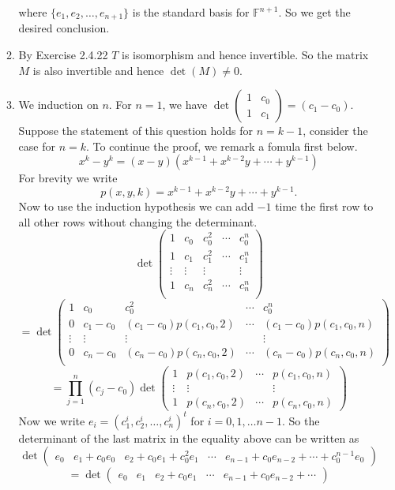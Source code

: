 \begin{enumerate}
\begin{enumerate}
where $\{e_1,e_2,\ldots ,e_{n+1}\}$ is the standard basis for $\mathbb{F}^{n+1}$. So we get the desired conclusion.
\item By Exercise 2.4.22 $T$ is isomorphism and hence invertible. So the matrix $M$ is also invertible and hence $\det(M)\neq 0$.
\item We induction on $n$. For $n=1$, we have $\det\begin{pmatrix}1&c_0\\1&c_1\end{pmatrix}=(c_1-c_0)$. Suppose the statement of this question holds for $n=k-1$, consider the case for $n=k$. To continue the proof, we remark a fomula first below.
\[x^k-y^k=(x-y)(x^{k-1}+x^{k-2}y+\cdots +y^{k-1})\]
For brevity we write 
\[p(x,y,k)=x^{k-1}+x^{k-2}y+\cdots +y^{k-1}.\]
Now to use the induction hypothesis we can add $-1$ time the first row to all other rows without changing the determinant.
\[\det\begin{pmatrix}1&c_0&c_0^2&\cdots &c_0^n\\1&c_1&c_1^2&\cdots &c_1^n\\\vdots &\vdots &\vdots & &\vdots \\1&c_n&c_n^2&\cdots &c_n^n\\\end{pmatrix}\]
\[=\det\begin{pmatrix}1&c_0&c_0^2&\cdots &c_0^n\\0&c_1-c_0&(c_1-c_0)p(c_1,c_0,2)&\cdots &(c_1-c_0)p(c_1,c_0,n)\\\vdots &\vdots &\vdots & &\vdots \\0&c_n-c_0&(c_n-c_0)p(c_n,c_0,2)&\cdots &(c_n-c_0)p(c_n,c_0,n)\\\end{pmatrix}\]
\[=\prod_{j=1}^n{(c_j-c_0)}\det\begin{pmatrix}1&p(c_1,c_0,2)&\cdots &p(c_1,c_0,n)\\\vdots &\vdots & &\vdots \\1&p(c_n,c_0,2)&\cdots &p(c_n,c_0,n)\end{pmatrix}\]
Now we write $e_i=(c_1^i,c_2^i,\ldots ,c_n^i)^t$ for $i=0,1,\ldots n-1$. So the determinant of the last matrix in the equality above can be written as 
\[\det\begin{pmatrix}e_0&e_1+c_0e_0&e_2+c_0e_1+c_0^2e_1&\cdots &e_{n-1}+c_0e_{n-2}+\cdots +c_0^{n-1}e_0\end{pmatrix}\] 
\[=\det\begin{pmatrix}e_0&e_1&e_2+c_0e_1&\cdots &e_{n-1}+c_0e_{n-2}+\cdots \end{pmatrix}\]

\end{enumerate}
\end{enumerate}
